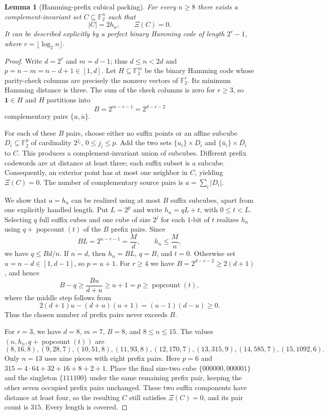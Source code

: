 \documentclass[11pt,a4paper]{article}
\newtheorem{lemma}[theorem]{Lemma}
\newcommand{\F}{\mathbb F_2}
\begin{document}
\begin{lemma}[Hamming-prefix cubical packing]\label{lem:v7packing}
For every $n\ge8$ there exists a complement-invariant set $C\subseteq\F^n$ such that
\[
 \boxed{\quad |C|=2h_n,\qquad \Xi(C)=0.\quad}
\]
It can be described explicitly by a perfect binary Hamming code of length $2^r-1$, where $r=\lfloor\log_2 n\rfloor$.
\end{lemma}
\begin{proof}
Write $d=2^r$ and $m=d-1$; thus $d\le n<2d$ and $p=n-m=n-d+1\in[1,d]$. Let $H\subseteq\F^m$ be the binary Hamming code whose parity-check columns are precisely the nonzero vectors of $\F^r$. Its minimum Hamming distance is three. The sum of the check columns is zero for $r\ge3$, so $\mathbf1\in H$ and $H$ partitions into
\[
 B=2^{m-r-1}=2^{d-r-2}
\]
complementary pairs $\{u,\bar u\}$.

For each of these $B$ pairs, choose either no suffix points or an affine subcube $D_i\subseteq\F^p$ of cardinality $2^{j_i}$, $0\le j_i\le p$. Add the two sets $\{u_i\}\times D_i$ and $\{\bar u_i\}\times\overline{D_i}$ to $C$. This produces a complement-invariant union of subcubes. Different prefix codewords are at distance at least three; each suffix subset is a subcube. Consequently, an exterior point has at most one neighbor in $C$, yielding $\Xi(C)=0$. The number of complementary source pairs is $a=\sum_i|D_i|$.

We show that $a=h_n$ can be realized using at most $B$ suffix subcubes, apart from one explicitly handled length. Put $L=2^p$ and write $h_n=qL+t$, with $0\le t<L$. Selecting $q$ full suffix cubes and one cube of size $2^j$ for each $1$-bit of $t$ realizes $h_n$ using $q+\operatorname{popcount}(t)$ of the $B$ prefix pairs. Since
\[
 BL=2^{n-r-1}=\frac{M}{d},\qquad h_n\le\frac{M}{n},
\]
we have $q\le Bd/n$. If $n=d$, then $h_n=BL$, $q=B$, and $t=0$. Otherwise set $u=n-d\in[1,d-1]$, so $p=u+1$. For $r\ge4$ we have $B=2^{d-r-2}\ge2(d+1)$, and hence
\[
 B-q\ge\frac{Bu}{d+u}\ge u+1=p\ge\operatorname{popcount}(t),
\]
where the middle step follows from
\[
 2(d+1)u-(d+u)(u+1)=(u-1)(d-u)\ge0.
\]
Thus the chosen number of prefix pairs never exceeds $B$.

For $r=3$, we have $d=8$, $m=7$, $B=8$, and $8\le n\le15$. The values $(n,h_n,q+\operatorname{popcount}(t))$ are
\[
 (8,16,8),(9,28,7),(10,51,8),(11,93,8),
 (12,170,7),(13,315,9),(14,585,7),(15,1092,6).
\]
Only $n=13$ uses nine pieces with eight prefix pairs. Here $p=6$ and
$315=4\cdot64+32+16+8+2+1$. Place the final size-two cube $\{000000,000001\}$ and the singleton $\{111100\}$ under the same remaining prefix pair, keeping the other seven occupied prefix pairs unchanged. These two suffix components have distance at least four, so the resulting $C$ still satisfies $\Xi(C)=0$, and its pair count is $315$. Every length is covered.
\end{proof}
\end{document}
